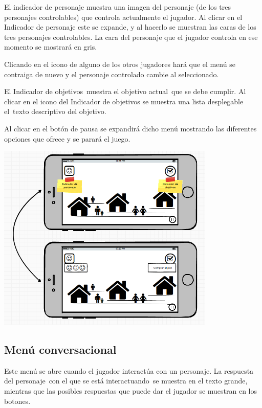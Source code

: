 {
El indicador de personaje muestra una imagen del personaje (de los tres personajes controlables) que controla
actualmente el jugador. Al clicar en el Indicador de personaje este se expande, y al hacerlo se muestran las caras de
los tres personajes controlables. La cara del personaje que el jugador controla en ese momento se mostrar\'a en gris.}

{
Clicando en el icono de alguno de los otros jugadores har\'a que el men\'u se contraiga de nuevo y el personaje
controlado cambie al seleccionado.}

{
El Indicador de objetivos\ muestra el objetivo actual\ que se debe cumplir. Al clicar en el icono del Indicador de
objetivos se muestra una lista desplegable el\ texto descriptivo del objetivo.}

{
Al clicar en el bot\'on de pausa se expandir\'a dicho men\'u mostrando las diferentes opciones que ofrece y se parar\'a
el juego.}

 \includegraphics[width=4.08763in,height=3.53967in]{anexos/GDD/GDD-img007.png} 

\subsection[Men\'u conversacional]{ Men\'u conversacional}
\hypertarget{Toc484614222}{}{
Este men\'u se abre cuando el jugador interact\'ua con un personaje. La respuesta del personaje\ con el que se est\'a
interactuando\ se muestra en el texto grande, mientras que las posibles respuestas que puede dar el jugador se muestran
en los botones.\ }

